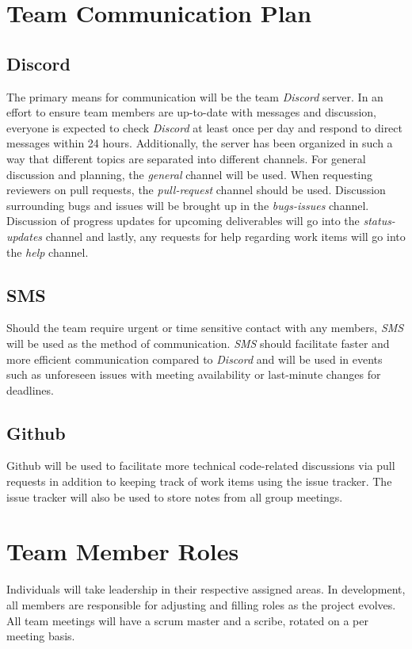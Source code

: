 \documentclass{article}
\begin{document}
\section{Team Communication Plan}

\subsection{Discord}

The primary means for communication will be the team \emph{Discord} server. In an effort to
ensure team members are up-to-date with messages and discussion, everyone is expected to check \emph{Discord}
at least once per day and respond to direct messages within 24 hours.
Additionally, the server has been organized in such a way that different topics are separated into different channels.
For general  discussion and planning, the \emph{general} channel will be used. When requesting reviewers on pull requests,
the \emph{pull-request} channel should be used. Discussion surrounding bugs and issues will be brought up in the
\emph{bugs-issues} channel. Discussion of progress updates for upcoming deliverables will go into the
\emph{status-updates} channel and lastly, any requests for help regarding work items will go into the \emph{help} channel.

\subsection{SMS}

Should the team require urgent or time sensitive contact with any members, \emph{SMS} will be used as the method
of communication. \emph{SMS} should facilitate faster and more efficient communication compared to \emph{Discord}
and will be used in events such as unforeseen issues with meeting availability or last-minute changes for deadlines.

\subsection{Github}

Github will be used to facilitate more technical code-related discussions via pull requests in addition to
keeping track of work items using the issue tracker. The issue tracker will also be used to store notes from
all group meetings.

\section{Team Member Roles}
Individuals will take leadership in their respective assigned areas. In development, all members are responsible for adjusting and filling roles as the project evolves. All team meetings will have a scrum master and a scribe, rotated on a per meeting basis.
\end{document}
